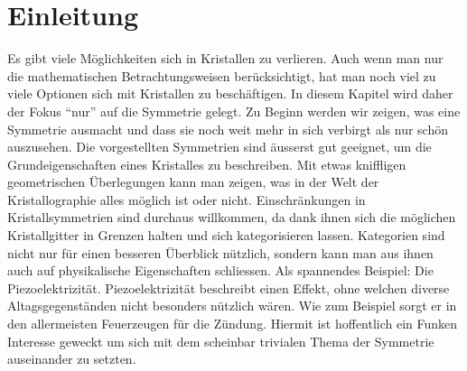 \section{Einleitung}

Es gibt viele Möglichkeiten sich in Kristallen zu verlieren.
Auch wenn man nur die mathematischen Betrachtungsweisen berücksichtigt, hat man noch viel zu viele Optionen sich mit Kristallen zu beschäftigen.
In diesem Kapitel wird daher der Fokus ``nur'' auf die Symmetrie gelegt.
Zu Beginn werden wir zeigen, was eine Symmetrie ausmacht und dass sie noch weit mehr in sich verbirgt als nur schön auszusehen.
Die vorgestellten Symmetrien sind äusserst gut geeignet, um die Grundeigenschaften eines Kristalles zu beschreiben.
Mit etwas kniffligen geometrischen Überlegungen kann man zeigen, was in der Welt der Kristallographie alles möglich ist oder nicht.
Einschränkungen in Kristallsymmetrien sind durchaus willkommen, da dank ihnen sich die möglichen Kristallgitter in Grenzen halten und sich kategorisieren lassen.
Kategorien sind nicht nur für einen besseren Überblick nützlich, sondern kann man aus ihnen auch auf physikalische Eigenschaften schliessen.
Als spannendes Beispiel: Die Piezoelektrizität.
Piezoelektrizität beschreibt einen Effekt, ohne welchen diverse Altagsgegenständen nicht besonders nützlich wären.
Wie zum Beispiel sorgt er in den allermeisten Feuerzeugen für die Zündung.
Hiermit ist hoffentlich ein Funken Interesse geweckt um sich mit dem scheinbar trivialen Thema der Symmetrie auseinander zu setzten.


